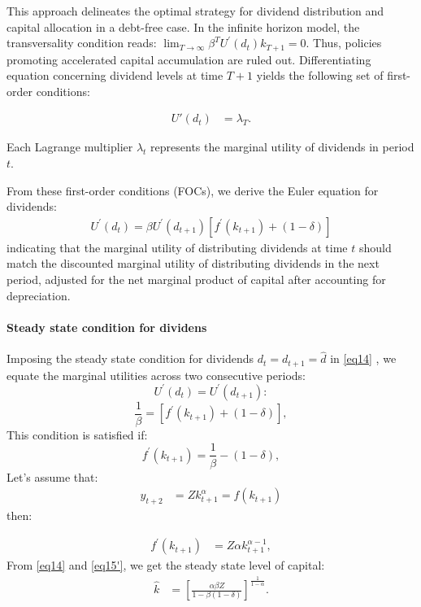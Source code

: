 \documentclass[12pt]{article}
\begin{document}
This approach delineates the optimal strategy for dividend distribution and capital allocation in a debt-free
case.
In the infinite horizon model, the transversality condition reads:
$\lim _{T \rightarrow \infty} \beta^T U^{\prime}\left(d_{t}\right) k_{T+1}=0$. 
Thus, policies promoting accelerated capital accumulation are ruled out.
Differentiating  equation concerning dividend levels at time \(T+1\) yields the following set of first-order
conditions:


\begin{align}
U'(d_{t}) &= \lambda_T.
\end{align}


Each Lagrange multiplier \(\lambda_t\) represents the marginal utility of dividends in period \(t\). 

From these first-order conditions (FOCs), we derive the Euler equation for dividends:
\begin{align}
    U^{\prime}(d_{t}) = \beta U^{\prime}(d_{t+1})[f^{\prime}(k_{t+1}) + (1-\delta)]  \label{eq14}
\end{align}
indicating that the marginal utility of distributing dividends at time \(t\) should match the discounted marginal
utility of distributing  dividends in the next period, adjusted for the net marginal product of capital after accounting
for depreciation.
\paragraph{Steady state condition for dividens}
Imposing the steady state condition for dividends \( d_t = d_{t+1} = \widehat{d} \) in \ref{eq14} , we
equate the marginal  utilities across two consecutive periods:
\[U^{\prime}(d_t) = U^{\prime}(d_{t+1}):\]
\[\frac{1}{\beta} = [f^{\prime}(k_{t+1}) + (1-\delta)],\]
This condition is satisfied if:
\[f^{\prime}(k_{t+1}) = \frac{1}{\beta} - (1-\delta),\]
Let's assume that:
\begin{align}
    y_{t+2} &= Z k^{\alpha}_{t+1} = f(k_{t+1})  \label{eq15}
\end{align}
then:

\begin{align}
    f^{\prime}(k_{t+1}) &= Z \alpha k^{\alpha-1}_{t+1},  \label{eq15'}
\end{align}
From \ref{eq14} and  \ref{eq15'}, we get the steady state level of capital:
\begin{align}
    \widehat{k} &= \left[\frac{\alpha \beta Z}{1 - \beta\left(1-\delta\right)}\right]^{\frac{1}{1-\alpha}}.  \label{eq16}
\end{align}
\end{document}
